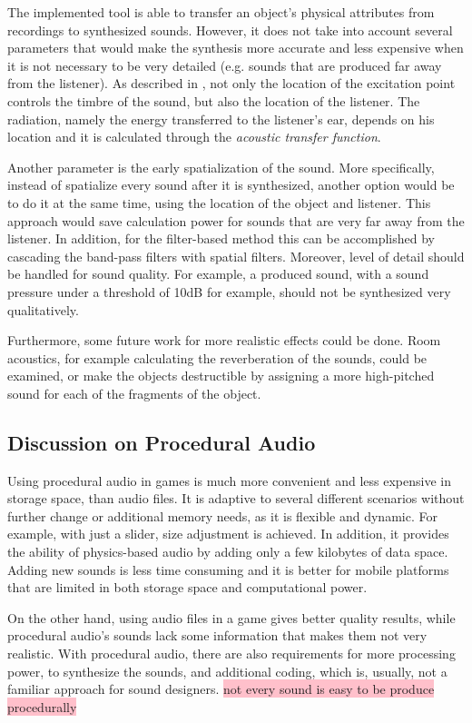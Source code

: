 The implemented tool is able to transfer an object's physical attributes from recordings to synthesized sounds. However, it does not take into account several parameters that would make the synthesis more accurate and less expensive when it is not necessary to be very detailed (e.g. sounds that are produced far away from the listener). As described in \cite{corbett2007timbrefields}, not only the location of the excitation point controls the timbre of the sound, but also the location of the listener. The radiation, namely the energy transferred to the listener's ear, depends on his location and it is calculated through the \textit{acoustic transfer function}. 

Another parameter is the early spatialization of the sound. More specifically, instead of spatialize every sound after it is synthesized, another option would be to do it at the same time, using the location of the object and listener. This approach would save calculation power for sounds that are very far away from the listener. In addition, for the filter-based method this can be accomplished by cascading the band-pass filters with spatial filters. Moreover, level of detail should be handled for sound quality. For example, a produced sound, with a sound pressure under a threshold of 10dB for example, should not be synthesized very qualitatively.   

Furthermore, some future work for more realistic effects could be done. Room acoustics, for example calculating the reverberation of the sounds, could be examined, or make the objects destructible by assigning a more high-pitched sound for each of the fragments of the object.

\subsection{Discussion on Procedural Audio}

Using procedural audio in games is much more convenient and less expensive in storage space, than audio files. It is adaptive to several different scenarios without further change or additional memory needs, as it is flexible and dynamic. For example, with just a slider, size adjustment is achieved. In addition, it provides the ability of physics-based audio by adding only a few kilobytes of data space. Adding new sounds is less time consuming and it is better for mobile platforms that are limited in both storage space and computational power.

On the other hand, using audio files in a game gives better quality results, while procedural audio's sounds lack some information that makes them not very realistic. With procedural audio, there are also requirements for more processing power, to synthesize the sounds, and additional coding, which is, usually, not a familiar approach for sound designers.
\colorbox{pink}{not every sound is easy to be produce procedurally}
